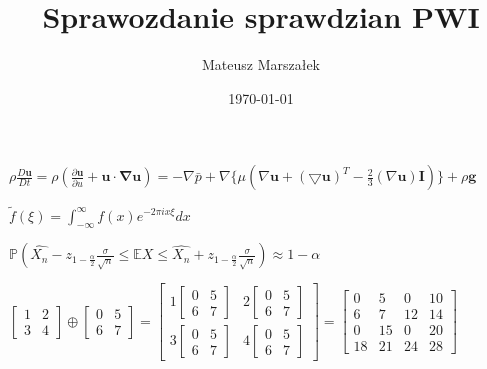 \documentclass[a4paper]{article}
\title{Sprawozdanie sprawdzian PWI}
\date{\today}
\author{Mateusz Marszałek}
\begin{document}
 \maketitle
 $\rho \frac{D\mathbf{u}}{Dt}=\rho (\frac{\partial \mathbf{u}}{\partial u}+\mathbf{u} \cdot \mathbf{\nabla u})=-\nabla \bar{p}+\nabla \{\mu (\nabla \mathbf{u}+(\bigtriangledown \mathbf{u})^T-\frac{2}{3}(\nabla \mathbf{u})\mathbf{I})\}+\rho \mathbf{g}$\\
 \vspace{1 cm}
 
 $\tilde{f}(\xi)=\int_{-\infty}^{\infty}f(x)e^{-2\pi ix\xi}dx$\\ 
 \vspace{1 cm}
 
 $\mathbb{P}(\hat{X_n}-z_{1-{\frac{\alpha}{2}}}\frac{\sigma}{\sqrt{n}}\leq \mathbb{E}X\leq \hat{X_n}+z_{1-\frac{\alpha}{2}}\frac{\sigma}{\sqrt{n}})\approx 1-\alpha$\\
 \vspace{1 cm}
 
 $
  \begin{bmatrix}
   1 & 2 \\
   3 & 4
  \end{bmatrix}
  \oplus
  \begin{bmatrix}
  0 & 5 \\
  6 & 7
  \end{bmatrix}
  =
  \begin{bmatrix}
   1\begin{bmatrix}
   0 & 5\\
   6 & 7
   \end{bmatrix}
   & 2\begin{bmatrix}
   0 & 5\\
   6 & 7
   \end{bmatrix}
   \\
   3\begin{bmatrix}
   0 & 5\\
   6 & 7
   \end{bmatrix}
   & 4\begin{bmatrix}
   0 & 5\\
   6 & 7
   \end{bmatrix}
  \end{bmatrix}
  =
  \begin{bmatrix}
   0 & 5 & 0 & 10 \\
   6 & 7 & 12 & 14 \\
   0 & 15 & 0 & 20 \\
   18 & 21 & 24 & 28
  \end{bmatrix}
$
\end{document}
